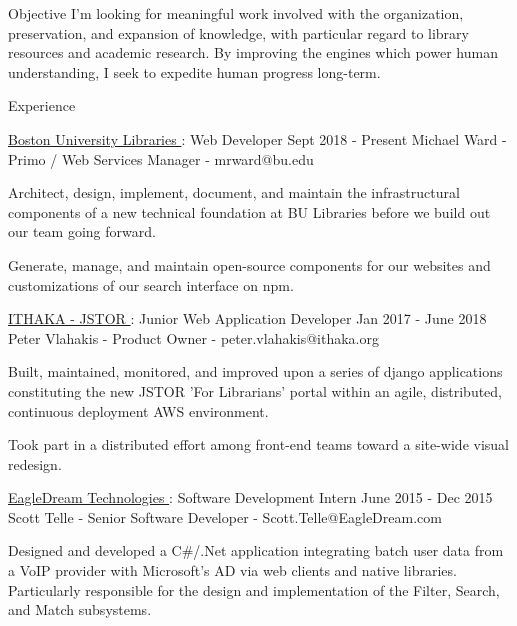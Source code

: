 \documentclass{resume} %
\begin{document}
  \begin{rSection}{Objective}
    I'm looking for meaningful work involved with the organization, preservation, and expansion of knowledge, with particular regard to library resources and academic research. By improving the engines which power human understanding, I seek to expedite human progress long-term.
  \end{rSection}

  \begin{rSection}{Experience}

    \begin{rSubsection}{\underline{Boston University Libraries }: Web Developer }{ Sept 2018 - Present }{ Michael Ward - Primo / Web Services Manager - mrward@bu.edu }

      \item Architect, design, implement, document, and maintain the infrastructural components of a new technical foundation at BU Libraries before we build out our team going forward.

      \item Generate, manage, and maintain open-source components for our websites and customizations of our search interface on npm.

    \end{rSubsection}

    \begin{rSubsection}{\underline{ITHAKA - JSTOR }: Junior Web Application Developer }{ Jan 2017 - June 2018 }{ Peter Vlahakis - Product Owner - peter.vlahakis@ithaka.org }

      \item Built, maintained, monitored, and improved upon a series of django applications constituting the new JSTOR 'For Librarians' portal within an agile, distributed, continuous deployment AWS environment.

      \item Took part in a distributed effort among front-end teams toward a site-wide visual redesign.

    \end{rSubsection}

    \begin{rSubsection}{\underline{EagleDream Technologies }: Software Development Intern }{ June 2015 - Dec 2015 }{ Scott Telle - Senior Software Developer - Scott.Telle@EagleDream.com }

      \item Designed and developed a C\#/.Net application integrating batch user data from a VoIP provider with Microsoft’s AD via web clients and native libraries. Particularly responsible for the design and implementation of the Filter, Search, and Match subsystems.


\end{rSubsection}
\end{rSection}
\end{document}
